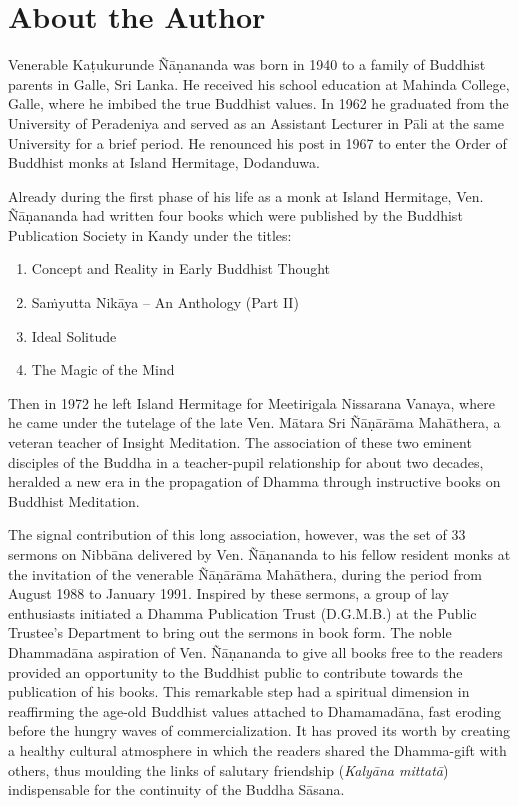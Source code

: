 \chapter{About the Author}

Venerable Kaṭukurunde Ñāṇananda was born in 1940 to a family of Buddhist parents in Galle, Sri Lanka. He received his school education at Mahinda College, Galle, where he imbibed the true Buddhist values. In 1962 he graduated from the University of Peradeniya and served as an Assistant Lecturer in Pāli at the same University for a brief period. He renounced his post in 1967 to enter the Order of Buddhist monks at Island Hermitage, Dodanduwa.

Already during the first phase of his life as a monk at Island Hermitage, Ven. Ñāṇananda had written four books which were published by the Buddhist Publication Society in Kandy under the titles:

\begin{enumerate}
\item Concept and Reality in Early Buddhist Thought
\item Saṁyutta Nikāya -- An Anthology (Part II)
\item Ideal Solitude
\item The Magic of the Mind
\end{enumerate}

Then in 1972 he left Island Hermitage for Meetirigala Nissarana Vanaya, where he came under the tutelage of the late Ven. Mātara Sri Ñāṇārāma Mahāthera, a veteran teacher of Insight Meditation. The association of these two eminent disciples of the Buddha in a teacher-pupil relationship for about two decades, heralded a new era in the propagation of Dhamma through instructive books on Buddhist Meditation.

The signal contribution of this long association, however, was the set of 33 sermons on Nibbāna delivered by Ven. Ñāṇananda to his fellow resident monks at the invitation of the venerable Ñāṇārāma Mahāthera, during the period from August 1988 to January 1991. Inspired by these sermons, a group of lay enthusiasts initiated a Dhamma Publication Trust (D.G.M.B.) at the Public Trustee's Department to bring out the sermons in book form. The noble Dhammadāna aspiration of Ven. Ñāṇananda to give all books free to the readers provided an opportunity to the Buddhist public to contribute towards the publication of his books. This remarkable step had a spiritual dimension in reaffirming the age-old Buddhist values attached to Dhamamadāna, fast eroding before the hungry waves of commercialization. It has proved its worth by creating a healthy cultural atmosphere in which the readers shared the Dhamma-gift with others, thus moulding the links of salutary friendship (\emph{Kalyāna mittatā}) indispensable for the continuity of the Buddha Sāsana.

